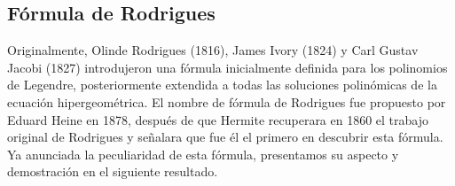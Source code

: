 \subsection{Fórmula de Rodrigues}
\label{subsection:Rodrigues}

Originalmente, Olinde Rodrigues (1816), James Ivory (1824) y Carl Gustav Jacobi (1827) introdujeron una fórmula inicialmente definida para los polinomios de Legendre, posteriormente extendida a todas las soluciones polinómicas de la ecuación hipergeométrica. El nombre de fórmula de Rodrigues fue propuesto por Eduard Heine en 1878, después de que Hermite recuperara en 1860 el trabajo original de Rodrigues y señalara que fue él el primero en descubrir esta fórmula. Ya anunciada la peculiaridad de esta fórmula, presentamos su aspecto y demostración en el siguiente resultado.

